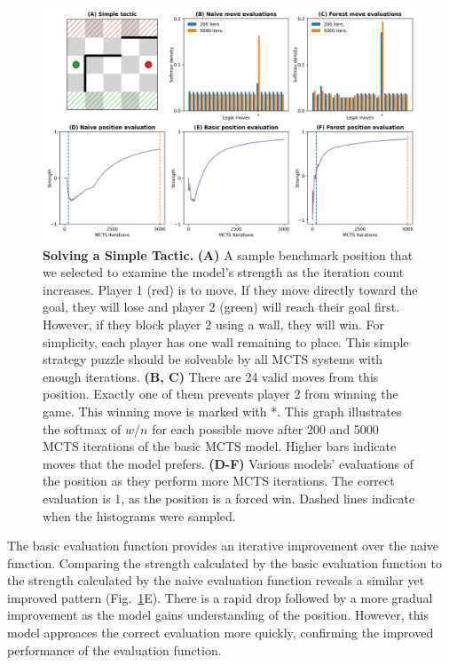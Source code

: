 \documentclass[10pt]{article}
\begin{document}
\begin{figure}[H]
    \centering
    \includegraphics[width=\linewidth]{MCTS_eval.png}
    \caption{\textbf{Solving a Simple Tactic.} \textbf{(A)} A sample benchmark position that we selected to examine the model's strength as the iteration count increases. Player 1 (red) is to move. If they move directly toward the goal, they will lose and player 2 (green) will reach their goal first. However, if they block player 2 using a wall, they will win. For simplicity, each player has one wall remaining to place. This simple strategy puzzle should be solveable by all MCTS systems with enough iterations. \textbf{(B, C)} There are 24 valid moves from this position. Exactly one of them prevents player 2 from winning the game. This winning move is marked with *. This graph illustrates the softmax of $w/n$ for each possible move after 200 and 5000 MCTS iterations of the basic MCTS model. Higher bars indicate moves that the model prefers. \textbf{(D-F)} Various models' evaluations of the position as they perform more MCTS iterations. The correct evaluation is 1, as the position is  a forced win. Dashed lines indicate when the histograms were sampled.}
    \label{fig:MCTS}
\end{figure}

The basic evaluation function provides an iterative improvement over the naive function. Comparing the strength calculated by the basic evaluation function to the strength calculated by the naive evaluation function reveals a similar yet improved pattern (Fig.~\ref{fig:MCTS}E). There is a rapid drop followed by a more gradual improvement as the model gains understanding of the position. However, this model approaces the correct evaluation more quickly, confirming the improved performance of the evaluation function. 
\end{document}
